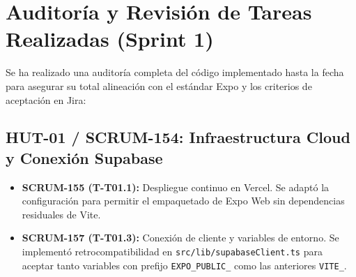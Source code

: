 \documentclass[11pt,a4paper]{article}
\begin{document}
\newpage

\section{Auditoría y Revisión de Tareas Realizadas (Sprint 1)}

Se ha realizado una auditoría completa del código implementado hasta la fecha para asegurar su total alineación con el estándar Expo y los criterios de aceptación en Jira:

\subsection{HUT-01 / SCRUM-154: Infraestructura Cloud y Conexión Supabase}
\begin{itemize}[leftmargin=*]
    \item \textbf{SCRUM-155 (T-T01.1):} Despliegue continuo en Vercel. Se adaptó la configuración para permitir el empaquetado de Expo Web sin dependencias residuales de Vite.
    \item \textbf{SCRUM-157 (T-T01.3):} Conexión de cliente y variables de entorno. Se implementó retrocompatibilidad en \texttt{src/lib/supabaseClient.ts} para aceptar tanto variables con prefijo \texttt{EXPO\_PUBLIC\_} como las anteriores \texttt{VITE\_}.
\end{itemize}
\end{document}
